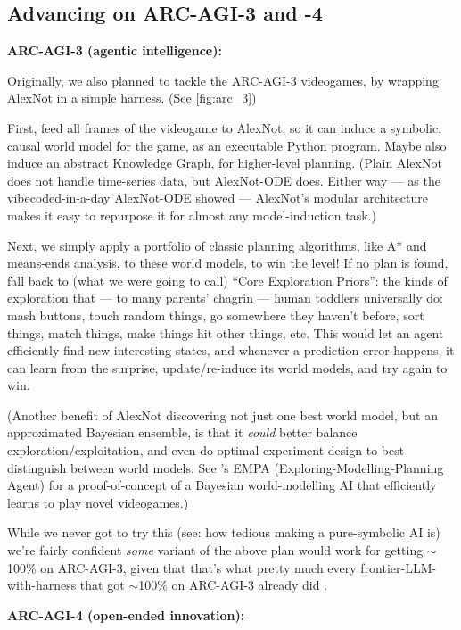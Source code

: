 \documentclass[11pt]{article}
\begin{document}
\subsection{Advancing on ARC-AGI-3 and -4}

\textbf{ARC-AGI-3 (agentic intelligence):}

Originally, we also planned to tackle the ARC-AGI-3 videogames, by wrapping AlexNot in a simple harness. (See \autoref{fig:arc_3})

First, feed all frames of the videogame to AlexNot, so it can induce a symbolic, causal world model for the game, as an executable Python program. Maybe also induce an abstract Knowledge Graph, for higher-level planning. (Plain AlexNot does not handle time-series data, but AlexNot-ODE does. Either way — as the vibecoded-in-a-day AlexNot-ODE showed — AlexNot's modular architecture makes it easy to repurpose it for almost any model-induction task.) 

Next, we simply apply a portfolio of classic planning algorithms, like A* and means-ends analysis, to these world models, to win the level! If no plan is found, fall back to (what we were going to call) ``Core Exploration Priors'': the kinds of exploration that — to many parents' chagrin — human toddlers universally do: mash buttons, touch random things, go somewhere they haven't before, sort things, match things, make things hit other things, etc. This would let an agent efficiently find new interesting states, and whenever a prediction error happens, it can learn from the surprise, update/re-induce its world models, and try again to win.

(Another benefit of AlexNot discovering not just one best world model, but an approximated Bayesian ensemble, is that it \textit{could} better balance exploration/exploitation, and even do optimal experiment design to best distinguish between world models. See \citet{empa}'s EMPA (Exploring-Modelling-Planning Agent) for a proof-of-concept of a Bayesian world-modelling AI that efficiently learns to play novel videogames.)

While we never got to try this (see: how tedious making a pure-symbolic AI is) we're fairly confident \textit{some} variant of the above plan would work for getting $\sim$100\% on ARC-AGI-3, given that that's what pretty much every frontier-LLM-with-harness that got $\sim$100\% on ARC-AGI-3 already did \citep{hill_climbing_arc_3,prolong_arc_3,retrodict_arc_3,astra_arc_3}.

\textbf{ARC-AGI-4 (open-ended innovation):}
\end{document}
